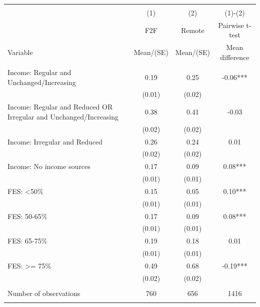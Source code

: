 
\begin{tabular}{@{\extracolsep{5pt}}lccc}
\\[-1.8ex]\hline \hline \\[-1.8ex]
 & \multicolumn{1}{c}{(1)}  & \multicolumn{1}{c}{(2)}  & \multicolumn{1}{c}{(1)-(2)} \\
 & \multicolumn{1}{c}{F2F}  & \multicolumn{1}{c}{Remote}  & \multicolumn{1}{c}{Pairwise t-test}  \\
Variable & Mean/(SE) & Mean/(SE) & Mean difference \\ \hline \\[-1.8ex] 
Income: Regular and Unchanged/Increasing   & 0.19    & 0.25    & -0.06***   \\
 & (0.01)  & (0.02)  &  \\ [1ex]
Income: Regular and Reduced OR Irregular and Unchanged/Increasing   & 0.38    & 0.41    & -0.03   \\
 & (0.02)  & (0.02)  &  \\ [1ex]
Income: Irregular and Reduced   & 0.26    & 0.24    & 0.01   \\
 & (0.02)  & (0.02)  &  \\ [1ex]
Income: No income sources   & 0.17    & 0.09    & 0.08***   \\
 & (0.01)  & (0.01)  &  \\ [1ex]
FES: <50\%   & 0.15    & 0.05    & 0.10***   \\
 & (0.01)  & (0.01)  &  \\ [1ex]
FES: 50-65\%   & 0.17    & 0.09    & 0.08***   \\
 & (0.01)  & (0.01)  &  \\ [1ex]
FES: 65-75\%   & 0.19    & 0.18    & 0.01   \\
 & (0.01)  & (0.01)  &  \\ [1ex]
FES: >= 75\%   & 0.49    & 0.68    & -0.19***   \\
 & (0.02)  & (0.02)  &  \\ [1ex]
\hline \\[-1.8ex]
Number of observations  & 760   & 656  & 1416  \\
\hline \hline \\[-1.8ex]

\end{tabular}
